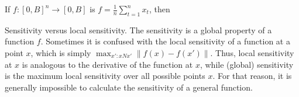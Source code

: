 \begin{frame}
{\begin{example}
      If $f: [0,B]^n \to [0,B]$ is
      $f = \frac{1}{n} \sum_{t=1}^n x_t$,
      then
    \end{example}
  }
  \begin{alertblock}{Sensitivity versus local sensitivity.}
    The sensitivity is a global property of a function $f$. Sometimes it is confused with the \alert{local} sensitivity of a function at a point $x$, which is simply $\max_{x': xNx'} \|f(x) - f(x')\|$. Thus, local sensitivity at $x$ is analogous to the derivative of the function at $x$, while (global) sensitivity is the maximum local sensitivity over all possible points $x$. For that reason, it is generally impossible to calculate the sensitivity of a general function.
  \end{alertblock}
\end{frame}

